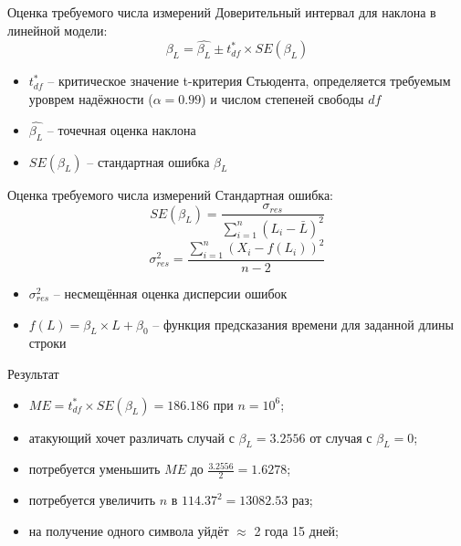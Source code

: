 \documentclass[14pt]{beamer}
\begin{document}
\begin{frame}{Оценка требуемого числа измерений}
  Доверительный интервал для наклона в линейной модели: \\
  \begin{equation}
  \beta_L = \hat{\beta_L} \pm t^{*}_{df} \times SE(\beta_L)
  \end{equation}
  \begin{itemize}
   \item $t^{*}_{df}$ -- критическое значение t-критерия Стьюдента, определяется
         требуемым уроврем надёжности ($\alpha = 0.99$) и числом степеней свободы $df$\\
   \item $\hat{\beta_L}$ -- точечная оценка наклона\\
   \item $SE(\beta_L)$ -- стандартная ошибка $\beta_L$
  \end{itemize}
\end{frame}

\begin{frame}[nologo]{Оценка требуемого числа измерений}
  Стандартная ошибка: \\
  \begin{equation}
  SE(\beta_L) = \frac{ \sigma_{res} }{ \sum^n_{i=1} (L_i - \bar{L})^2 }
  \end{equation}
  \begin{equation}
  \sigma_{res}^2 = \frac{ \sum^n_{i=1}  (X_i - f(L_i))^2 }{ n - 2 }
  \end{equation}
  \begin{itemize}
    \item $\sigma_{res}^2$ -- несмещённая оценка дисперсии ошибок \\
    \item $f(L) = \beta_{L} \times L + \beta_0$ -- функция предсказания времени для заданной длины строки \\
  \end{itemize}
\end{frame}

\begin{frame}[nologo]{Результат}
\begin{itemize}
\item  $ME = t^{*}_{df} \times SE(\beta_L) = 186.186$ при $n = 10^6$;
\item атакующий хочет различать случай с $\beta_L = 3.2556$ от случая с $\beta_L = 0$;
\item потребуется уменьшить $ME$ до $\frac{3.2556}{2} = 1.6278$;
\item потребуется увеличить $n$ в $114.37^2 = 13082.53$ раз;
\item на получение одного символа уйдёт $\approx$ 2 года 15 дней;
\end{itemize}
\end{frame}

\itmothankyou
\end{document}
